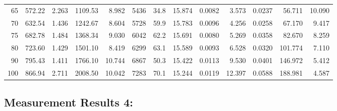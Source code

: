 \documentclass[10pt]{article}
\begin{document}
{\begin{tabular}{|r|rr|rr|rr|rr|rr|r|r|}
       65 &       572.22 &        2.263 &      1109.53 &        8.982 &         5436 &         34.8 &       15.874 &       0.0082 &        3.573 &       0.0237 &       56.711 &       10.090 \\
       70 &       632.54 &        1.436 &      1242.67 &        8.604 &         5728 &         59.9 &       15.783 &       0.0096 &        4.256 &       0.0258 &       67.170 &        9.417 \\
       75 &       682.78 &        1.484 &      1368.34 &        9.030 &         6042 &         62.2 &       15.691 &       0.0080 &        5.269 &       0.0358 &       82.670 &        8.259 \\
       80 &       723.60 &        1.429 &      1501.10 &        8.419 &         6299 &         63.1 &       15.589 &       0.0093 &        6.528 &       0.0320 &      101.774 &        7.110 \\
       90 &       795.43 &        1.411 &      1766.10 &       10.744 &         6867 &         50.3 &       15.422 &       0.0113 &        9.530 &       0.0401 &      146.972 &        5.412 \\
      100 &       866.94 &        2.711 &      2008.50 &       10.042 &         7283 &         70.1 &       15.244 &       0.0119 &       12.397 &       0.0588 &      188.981 &        4.587 \\
\hline
\end{tabular}
}



\subsection*{\large \bf Measurement Results 4:}
\end{document}
